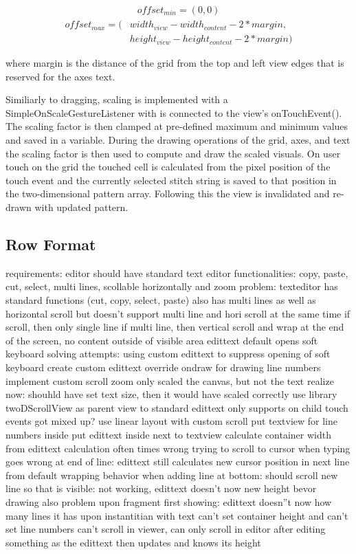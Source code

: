 \begin{gather*}
offset_{min} = (0, 0)
\end{gather*}
\begin{align*}
offset_{max} = (&width_{view} - width_{content} - 2 * margin, \\
				&height_{view} - height_{content} - 2 * margin)
\end{align*}

where margin is the distance of the grid from the top and left view edges that is reserved for the axes text.

Similiarly to dragging, scaling is implemented with a SimpleOnScaleGestureListener with is connected to the view's onTouchEvent(). The scaling factor is then clamped at pre-defined maximum and minimum values and saved in a variable. During the drawing operations of the grid, axes, and text the scaling factor is then used to compute and draw the scaled visuals. On user touch on the grid the touched cell is calculated from the pixel position of the touch event and the currently selected stitch string is saved to that position in the two-dimensional pattern array. Following this the view is invalidated and re-drawn with updated pattern.   

\subsection{Row Format}
\label{impl_row_format}

requirements: 
	editor should have standard text editor functionalities: copy, paste, cut, select, multi lines, scollable horizontally and zoom
problem:
	texteditor has standard functions (cut, copy, select, paste) 
	also has multi lines as well as horizontal scroll
	but doesn't support multi line and hori scroll at the same time
	if scroll, then only single line
	if multi line, then vertical scroll and wrap at the end of the screen, no content outside of visible area
	edittext default opens soft keyboard
solving attempts:
	using custom edittext to suppress opening of soft keyboard  
	create custom edittext 
		override ondraw for drawing line numbers
		implement custom scroll
		zoom only scaled the canvas, but not the text
		realize now: shouhld have set text size, then it would have scaled correctly
	use library twoDScrollView as parent view to standard edittext
		only supports on child
		touch events got mixed up?
	use linear layout with custom scroll
		put textview for line numbers inside
		put edittext inside next to textview
		calculate container width from edittext
		calculation often times wrong
		trying to scroll to cursor when typing goes wrong at end of line: edittext still calculates new cursor position in next line from default wrapping behavior
		when adding line at bottom: should scroll new line so that is visible: not working, edittext doesn't now new height bevor drawing
		also problem upon fragment first showing: edittext doesn''t now how many lines it has upon instantitian with text 
		can't set container height and can't set line numbers
		can't scroll in viewer, can only scroll in editor after editing something as the edittext then updates and knows its height


